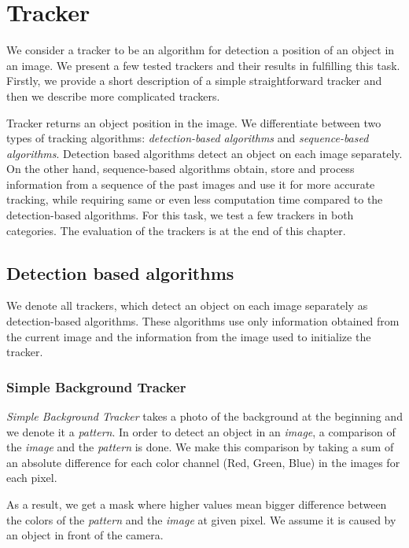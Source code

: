\chapter{Tracker}

We consider a tracker to be an algorithm for detection a position of an object in
an image. We present a few tested trackers and their results in fulfilling this task.
Firstly, we provide a short description of a simple straightforward tracker and
then we describe more complicated trackers.

Tracker returns an object position in the image. We differentiate between two
types of tracking algorithms: \emph{detection-based algorithms} and
\emph{sequence-based algorithms}. Detection based algorithms detect an object
on each image separately. On the other hand, sequence-based algorithms obtain,
store and process information from a sequence of the past images and use it
for more accurate tracking, while requiring same or even less computation time
compared to the detection-based algorithms. For this task, we test a few trackers
in both categories. The evaluation of the trackers is at the end of this chapter.


\section {Detection based algorithms}

We denote all trackers, which detect an object on each image separately as
detection-based algorithms. These algorithms use only information obtained from
the current image and the information from the image used to initialize the tracker.

\subsection{Simple Background Tracker}

\emph{Simple Background Tracker} takes a photo of the background at the
beginning and we denote it a \emph{pattern}. In order to detect an object in
an \emph{image}, a comparison of the \emph{image} and the \emph{pattern} is done.
We make this comparison by taking a sum of an absolute difference for each
color channel (Red, Green, Blue) in the images for each pixel.

As a result, we get a mask where higher values mean bigger difference between
the colors of the \emph{pattern} and the \emph{image} at given pixel. We assume it
is caused by an object in front of the camera.

